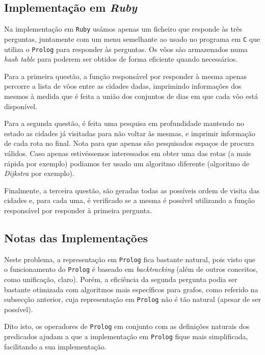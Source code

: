 \documentclass[12pt,a4paper,oneside]{article}
\begin{document}
\subsection{Implementação em \textit{Ruby}}

Na implementação em \texttt{Ruby} usámos apenas um ficheiro que
responde às três perguntas, juntamente com um menu semelhante ao usado
no programa em \texttt{C} que utiliza o \texttt{Prolog} para responder
às perguntas. Os vôos são armazenados numa \textit{hash table} para
poderem ser obtidos de forma eficiente quando necessários.

Para a primeira questão, a função responsável por responder à mesma
apenas percorre a lista de vôos entre as cidades dadas, imprimindo
informações dos mesmos à medida que é feita a união dos conjuntos de
dias em que cada vôo está disponível.

Para a segunda questão, é feita uma pesquisa em profundidade mantendo
no estado as cidades já visitadas para não voltar às mesmas, e imprimir
informação de cada rota no final. Nota para que apenas são pesquisados
espaços de procura válidos. Caso apenas estivéssemos interessados em
obter uma das rotas (a mais rápida por exemplo) podiamos ter usado um
algoritmo diferente (algoritmo de \textit{Dijkstra} por exemplo).

Finalmente, a terceira questão, são geradas todas as possíveis ordem de
visita das cidades e, para cada uma, é verificado se a mesma é possível
utilizando a função responsável por responder à primeira pergunta.

\subsection{Notas das Implementações}

Neste problema, a representação em \texttt{Prolog} fica bastante
natural, pois visto que o funcionamento do \texttt{Prolog} é baseado
em \textit{backtracking} (além de outros conceitos, como unificação,
claro). Porém, a eficiência da segunda pergunta podia ser bastante
otimizada com algoritmos mais específicos para grafos, como referido
na subsecção anterior, cuja representação em \texttt{Prolog} não é tão
natural (apesar de ser possível).

Dito isto, os operadores de \texttt{Prolog} em conjunto com as
definições naturais dos predicados ajudam a que a implementação em
\texttt{Prolog} fique mais simplificada, facilitando a sua
implementação.

\end{document}
